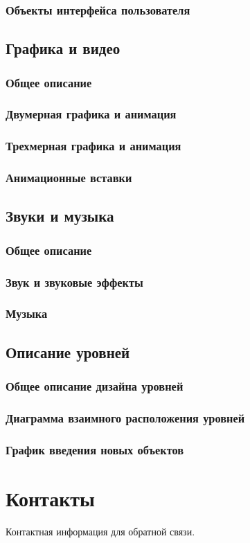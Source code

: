 \documentclass{article}
\begin{document}
\subsubsection{Объекты интерфейса пользователя}


\subsection{Графика и видео}
\subsubsection{Общее описание}


\subsubsection{Двумерная графика и анимация}


\subsubsection{Трехмерная графика и анимация}


\subsubsection{Анимационные вставки}


\subsection{Звуки и музыка}
\subsubsection{Общее описание}


\subsubsection{Звук и звуковые эффекты}


\subsubsection{Музыка}


\subsection{Описание уровней}
\subsubsection{Общее описание дизайна уровней}


\subsubsection{Диаграмма взаимного расположения уровней}


\subsubsection{График введения новых объектов}


\newpage

\section{Контакты}
Контактная информация для обратной связи.
\end{document}
